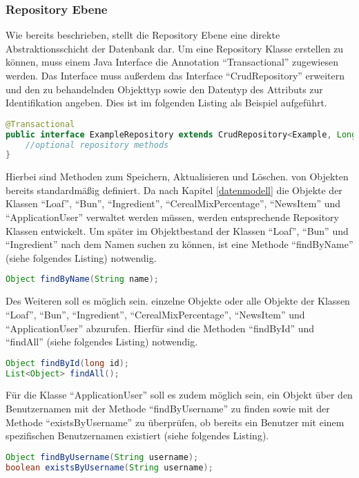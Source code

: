 \subsubsection{Repository Ebene}
Wie bereits beschrieben, stellt die Repository Ebene eine direkte Abstraktionsschicht der Datenbank dar.
Um eine Repository Klasse erstellen zu können, muss einem Java Interface die Annotation \enquote{Transactional} zugewiesen werden. Das Interface muss außerdem das Interface \enquote {CrudRepository} erweitern und den zu behandelnden Objekttyp sowie den Datentyp des Attributs zur Identifikation angeben. Dies ist im folgenden Listing als Beispiel aufgeführt.
\begin{lstlisting}[language=Java]
@Transactional
public interface ExampleRepository extends CrudRepository<Example, Long> {
	//optional repository methods
}
\end{lstlisting}

Hierbei sind Methoden zum Speichern, Aktualisieren und Löschen. von Objekten bereits standardmäßig definiert.
Da nach Kapitel \ref{datenmodell} die Objekte der Klassen \enquote{Loaf}, \enquote{Bun}, \enquote{Ingredient}, \enquote{CerealMixPercentage}, \enquote{NewsItem} und \enquote{ApplicationUser} verwaltet werden müssen, werden entsprechende Repository Klassen entwickelt.
Um später im Objektbestand der Klassen \enquote{Loaf}, \enquote{Bun} und \enquote{Ingredient} nach dem Namen suchen zu können, ist eine Methode \enquote{findByName} (siehe folgendes Listing) notwendig.
\begin{lstlisting}[language=Java]
Object findByName(String name);
\end{lstlisting}

Des Weiteren soll es möglich sein. einzelne Objekte oder alle Objekte der Klassen \enquote{Loaf}, \enquote{Bun}, \enquote{Ingredient}, \enquote{CerealMixPercentage}, \enquote{NewsItem} und \enquote{ApplicationUser} abzurufen.
Hierfür sind die Methoden \enquote{findById} und \enquote{findAll} (siehe folgendes Listing) notwendig.
\begin{lstlisting}[language=Java]
Object findById(long id);
List<Object> findAll();
\end{lstlisting}

\clearpage

Für die Klasse \enquote{ApplicationUser} soll es zudem möglich sein, ein Objekt über den Benutzernamen mit der Methode \enquote{findByUsername} zu finden sowie mit der Methode \enquote{existsByUsername} zu überprüfen, ob bereits ein Benutzer mit einem spezifischen Benutzernamen existiert (siehe folgendes Listing).
\begin{lstlisting}[language=Java]
Object findByUsername(String username);
boolean existsByUsername(String username);
\end{lstlisting}

